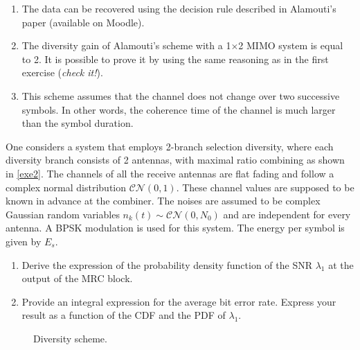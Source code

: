 \documentclass [a4paper, 11pt] {article}
\begin{document}
\begin{solution}
\begin{enumerate}
    \item The data can be recovered using the decision rule described in Alamouti's paper (available on Moodle).
    \item The diversity gain of Alamouti's scheme with a 1$\times$2 MIMO system is equal to 2. It is possible to prove it by using the same reasoning as in the first exercise (\textit{check it!}).
    \item This scheme assumes that the channel does not change over two successive symbols. In other words, the coherence time of the channel is much larger than the symbol duration. 
\end{enumerate}

    \end{solution}
   
    \begin{exercise}{5}
        One considers a system that employs 2-branch selection diversity, where each diversity branch consists of 2 antennas, with maximal ratio combining as shown in \autoref{exe2}. The channels of all the receive antennas are flat fading and follow a complex normal distribution $\mathcal{C}\mathcal{N}(0,1)$. These channel values are supposed to be known in advance at the combiner. The noises are assumed to be complex Gaussian random variables $n_k(t) \sim \mathcal{C}\mathcal{N}(0,N_0)$ and are independent for every antenna. A BPSK modulation is used for this system. The energy per symbol is given by $E_s$.

        \begin{enumerate}
            \item Derive the expression of the probability density function of the SNR $\lambda_1$ at the output of the MRC block.
            \item Provide an integral expression for the average bit error rate. Express your result as a function of the CDF and the PDF of $\lambda_1$.
        \end{enumerate}
        
        \begin{figure}[H]
            \centering
            
            \caption{Diversity scheme.}
            \label{exe2}
            \end{figure}
    \end{exercise}
\end{document}
